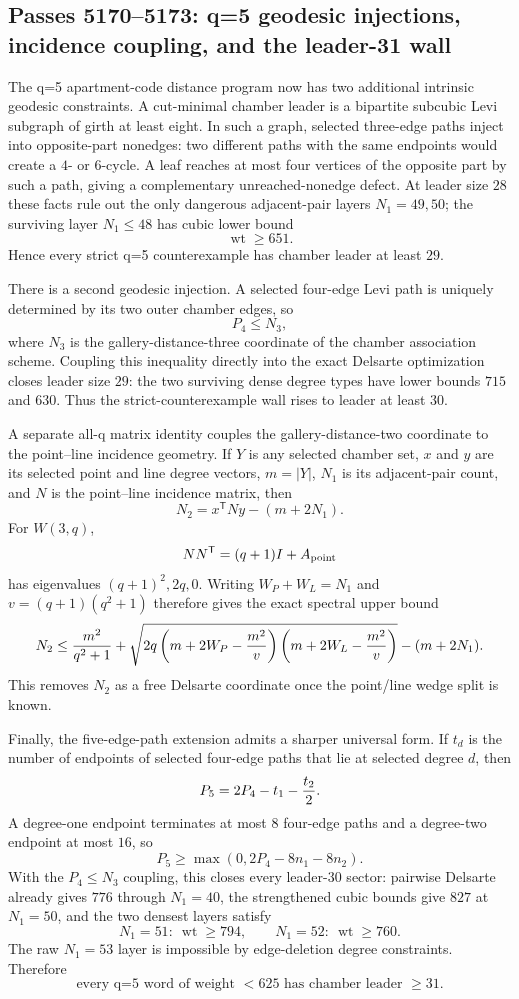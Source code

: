\ifdefined\WPassFiveOneSevenZeroLoaded\else
\gdef\WPassFiveOneSevenZeroLoaded{1}
\subsection*{Passes 5170--5173: q=5 geodesic injections, incidence coupling, and the leader-31 wall}
The q=5 apartment-code distance program now has two additional intrinsic geodesic constraints.  A cut-minimal chamber leader is a bipartite subcubic Levi subgraph of girth at least eight.  In such a graph, selected three-edge paths inject into opposite-part nonedges: two different paths with the same endpoints would create a $4$- or $6$-cycle.  A leaf reaches at most four vertices of the opposite part by such a path, giving a complementary unreached-nonedge defect.  At leader size $28$ these facts rule out the only dangerous adjacent-pair layers $N_1=49,50$; the surviving layer $N_1\le48$ has cubic lower bound
\[
 \operatorname{wt}\ge651.
\]
Hence every strict q=5 counterexample has chamber leader at least $29$.

There is a second geodesic injection.  A selected four-edge Levi path is uniquely determined by its two outer chamber edges, so
\[
 P_4\le N_3,
\]
where $N_3$ is the gallery-distance-three coordinate of the chamber association scheme.  Coupling this inequality directly into the exact Delsarte optimization closes leader size $29$: the two surviving dense degree types have lower bounds $715$ and $630$.  Thus the strict-counterexample wall rises to leader at least $30$.

A separate all-q matrix identity couples the gallery-distance-two coordinate to the point--line incidence geometry.  If $Y$ is any selected chamber set, $x$ and $y$ are its selected point and line degree vectors, $m=|Y|$, $N_1$ is its adjacent-pair count, and $N$ is the point--line incidence matrix, then
\[
 \boxed{\;N_2=x^{\mathsf T}Ny-(m+2N_1).\;}
\]
For $W(3,q)$,
\[
 NN^{\mathsf T}=(q+1)I+A_{\rm point}
\]
has eigenvalues $(q+1)^2,2q,0$.  Writing $W_P+W_L=N_1$ and $v=(q+1)(q^2+1)$ therefore gives the exact spectral upper bound
\[
 N_2\le {m^2\over q^2+1}
 +\sqrt{2q\left(m+2W_P-{m^2\over v}\right)
                \left(m+2W_L-{m^2\over v}\right)}
 -(m+2N_1).
\]
This removes $N_2$ as a free Delsarte coordinate once the point/line wedge split is known.

Finally, the five-edge-path extension admits a sharper universal form.  If $t_d$ is the number of endpoints of selected four-edge paths that lie at selected degree $d$, then
\[
 P_5=2P_4-t_1-{t_2\over2}.
\]
A degree-one endpoint terminates at most $8$ four-edge paths and a degree-two endpoint at most $16$, so
\[
 \boxed{\;P_5\ge \max(0,2P_4-8n_1-8n_2).\;}
\]
With the $P_4\le N_3$ coupling, this closes every leader-$30$ sector: pairwise Delsarte already gives $776$ through $N_1=40$, the strengthened cubic bounds give $827$ at $N_1=50$, and the two densest layers satisfy
\[
 N_1=51:\ \operatorname{wt}\ge794,
 \qquad
 N_1=52:\ \operatorname{wt}\ge760.
\]
The raw $N_1=53$ layer is impossible by edge-deletion degree constraints.  Therefore
\[
 \boxed{\text{every q=5 word of weight }<625\text{ has chamber leader }\ge31.}
\]

